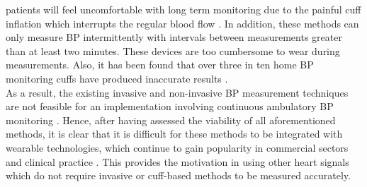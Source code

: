 patients will feel uncomfortable with long term monitoring due to the painful cuff 
inflation which interrupts the regular blood flow \cite{Tanveer2018}. In addition, 
these methods can only measure BP intermittently with intervals between measurements 
greater than at least two minutes. These devices are too cumbersome to wear during 
measurements. Also, it has been found that over three in ten home BP monitoring 
cuffs have produced inaccurate results \cite{Leung2016}. \\ \newline \noindent  As a 
result, the existing invasive and non-invasive BP measurement techniques are not 
feasible for an implementation involving continuous ambulatory BP 
monitoring \cite{ElHajj2020}. Hence, after having assessed the viability of all 
aforementioned methods, it is clear that it is difficult for these methods to be 
integrated with wearable technologies, which continue to gain popularity in 
commercial sectors and clinical practice \cite{Sharma2017}. This provides the motivation in using 
other heart signals which do not require invasive or cuff-based methods to be measured accurately.

